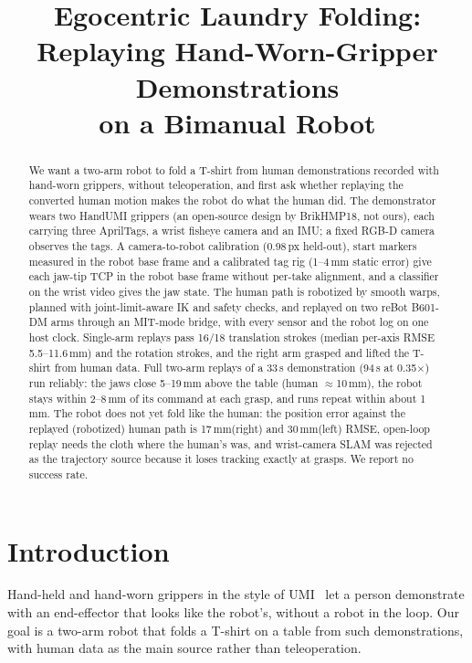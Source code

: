\documentclass[conference,10pt]{IEEEtran}
\newcommand{\mm}{\,mm\xspace}
\begin{document}
\title{Egocentric Laundry Folding:\\Replaying Hand-Worn-Gripper Demonstrations\\on a Bimanual Robot}
\author{
}
\maketitle

\begin{abstract}
We want a two-arm robot to fold a T-shirt from human demonstrations recorded with hand-worn grippers, without
teleoperation, and first ask whether replaying the converted human motion makes the robot do what the human did. The
demonstrator wears two HandUMI grippers (an open-source design by BrikHMP18, not ours), each carrying three AprilTags, a
wrist fisheye camera and an IMU; a fixed RGB-D camera observes the tags. A camera-to-robot calibration (0.98\,px held-out),
start markers measured in the robot base frame and a calibrated tag rig (1--4\mm static error) give each jaw-tip TCP in the
robot base frame without per-take alignment, and a classifier on the wrist video gives the jaw state. The human path is
robotized by smooth warps, planned with joint-limit-aware IK and safety checks, and replayed on two reBot B601-DM arms
through an MIT-mode bridge, with every sensor and the robot log on one host clock. Single-arm replays pass 16/18 translation strokes
(median per-axis RMSE 5.5--11.6\mm) and the rotation strokes, and the right arm grasped and lifted the T-shirt from human data.
Full two-arm replays of a 33\,s demonstration (94\,s at 0.35$\times$) run reliably: the jaws close 5--19\mm above the table (human $\approx$10\mm), the robot stays
within 2--8\mm of its command at each grasp, and runs repeat within about 1\mm. The robot does not yet fold like the
human: the position error against the replayed (robotized) human path is 17\mm (right) and 30\mm (left) RMSE, open-loop replay needs the cloth where
the human's was, and wrist-camera SLAM was rejected as the trajectory source because it loses tracking exactly at grasps.
We report no success rate.
\end{abstract}

\section{Introduction}\label{sec:intro}
Hand-held and hand-worn grippers in the style of UMI~\cite{chi2024umi} let a person demonstrate with an end-effector that
looks like the robot's, without a robot in the loop. Our goal is a two-arm robot that folds a T-shirt on a table from
such demonstrations, with human data as the main source rather than teleoperation.
\end{document}
